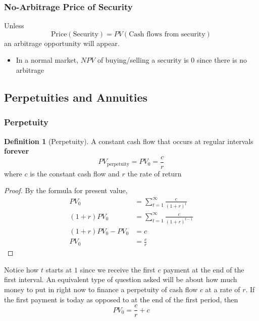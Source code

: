 \documentclass[11pt]{article}
\theoremstyle{definition}
\newtheorem*{definition}{Definition}
\newcounter{question}[section]\setcounter{question}{0}
\begin{document}
\subsubsection{No-Arbitrage Price of Security}
Unless 
\begin{equation*}
    \text{Price}(\text{Security}) = PV(\text{Cash flows from security})
\end{equation*}
an arbitrage opportunity will appear.
\begin{itemize}
    \item In a normal market, $NPV$ of buying/selling a security is $0$ since there is no arbitrage
\end{itemize}

\subsection{Perpetuities and Annuities}
\subsubsection{Perpetuity}
\begin{definition}[Perpetuity]
    A constant cash flow that occurs at regular intervals \textbf{forever}
    \begin{equation*}
        PV_{\text{perpetuity}} = PV_0 = \frac{c}{r}
    \end{equation*}
    where $c$ is the constant cash flow and $r$ the rate of return
\end{definition}
\begin{proof}
    By the formula for present value,
    \begin{align*}
        PV_0 &= \sum_{t=1}^\infty \frac{c}{(1 + r)^t}\\
        (1 + r)PV_0 &= \sum_{t =1}^\infty \frac{c}{(1 + r)^{t - 1}}\\
        (1 + r)PV_0 - PV_0 &= c\\
        PV_0 &= \frac{c}{r}
    \end{align*}
\end{proof}
Notice how $t$ starts at $1$ since we receive the first $c$ payment at the end of the first interval. An equivalent type of question asked will be about how much money to put in right now to finance a perpetuity of cash flow $c$ at a rate of $r$. If the first payment is today as opposed to at the end of the first period, then 
\begin{equation*}
    PV_0 = \frac{c}{r} + c
\end{equation*}
\end{document}
